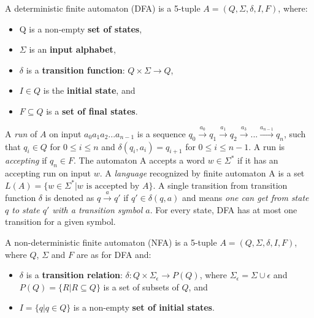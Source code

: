 \begin{definition} \hfill \newline
    A deterministic finite automaton (DFA) is a 5-tuple $A = (Q, \Sigma, \delta, I, F)$, where:
    \begin{itemize}
        \item Q is a non-empty \textbf{set of states},
        \item $\Sigma$ is an \textbf{input alphabet},
        \item $\delta$ is a \textbf{transition function}: $Q \times \Sigma \rightarrow{} Q$,
        \item $I \in Q$ is the \textbf{initial state}, and
        \item $F \subseteq Q$ is a \textbf{set of final states}.
    \end{itemize}
\end{definition}

A \emph{run} of $A$ on input $a_0a_1a_2...a_{n-1}$ is a sequence $q_0 \xrightarrow{a_0} q_1 \xrightarrow{a_1} q_2 \xrightarrow{a_3} ... \xrightarrow{a_{n-1}} q_n$, such that $q_i \in Q$ for $0 \leq i \leq n$ and $\delta(q_i, a_i) = q_{i+1}$ for $0 \leq i \leq n - 1$. A run is \emph{accepting} if $q_n \in F$. The automaton A accepts a word $w \in \Sigma^*$ if it has an accepting run on input $w$. A \emph{language} recognized by finite automaton A is a set $L(A) = \{w \in \Sigma^* | w \text{ is accepted by } A\}$. A single transition from transition function $\delta$ is denoted as $q \xrightarrow{a} q'$ if $q' \in \delta(q, a)$ and means \textit{one can get from state $q$ to state $q'$ with a transition symbol $a$}. For every state, DFA has at most one transition for a given symbol.

\begin{definition}
    A non-deterministic finite automaton (NFA) is a 5-tuple $A = (Q, \Sigma, \delta, I, F)$, where $Q$, $\Sigma$ and $F$ are as for DFA and:
    \begin{itemize}
        \item $\delta$ is a \textbf{transition relation}: $\delta: Q \times \Sigma_{\epsilon} \rightarrow{} P(Q)$, where $\Sigma_{\epsilon} = \Sigma \cup \epsilon$ and $P(Q) = \{R | R \subseteq Q\}$ is a set of subsets of $Q$, and
        \item $I = \{q | q \in Q\}$ is a non-empty \textbf{set of initial states}.
    \end{itemize}
\end{definition}

